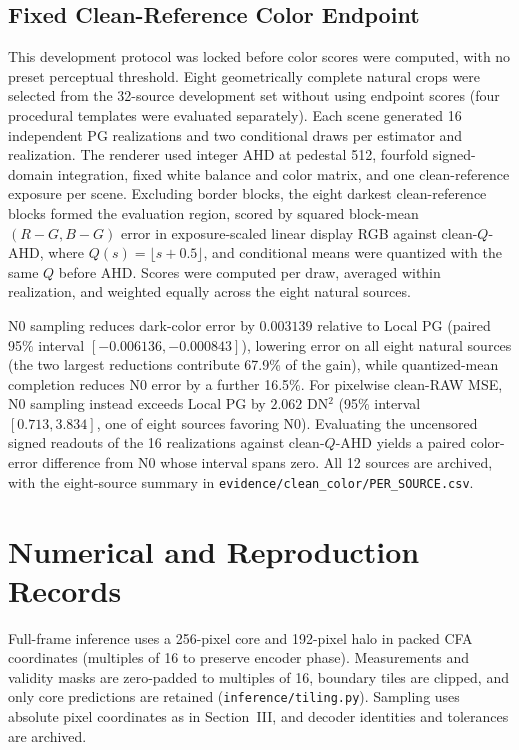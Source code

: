 \documentclass[10pt,twocolumn,journal]{IEEEtran}
\begin{document}
\subsection{Fixed Clean-Reference Color Endpoint}\label{sec:cleanendpoint}
This development protocol was locked before color scores were computed, with no preset perceptual threshold. Eight geometrically complete natural crops were selected from the 32-source development set without using endpoint scores (four procedural templates were evaluated separately). Each scene generated 16 independent PG realizations and two conditional draws per estimator and realization. The renderer used integer AHD at pedestal 512, fourfold signed-domain integration, fixed white balance and color matrix, and one clean-reference exposure per scene. Excluding border blocks, the eight darkest clean-reference blocks formed the evaluation region, scored by squared block-mean $(R-G,B-G)$ error in exposure-scaled linear display RGB against clean-$Q$-AHD, where $Q(s)=\lfloor s+0.5\rfloor$, and conditional means were quantized with the same $Q$ before AHD. Scores were computed per draw, averaged within realization, and weighted equally across the eight natural sources.

N0 sampling reduces dark-color error by $0.003139$ relative to Local PG (paired 95\% interval $[-0.006136,-0.000843]$), lowering error on all eight natural sources (the two largest reductions contribute 67.9\% of the gain), while quantized-mean completion reduces N0 error by a further 16.5\%. For pixelwise clean-RAW MSE, N0 sampling instead exceeds Local PG by $2.062$ DN$^2$ (95\% interval $[0.713,3.834]$, one of eight sources favoring N0). Evaluating the uncensored signed readouts of the 16 realizations against clean-$Q$-AHD yields a paired color-error difference from N0 whose interval spans zero. All 12 sources are archived, with the eight-source summary in \texttt{evidence/clean\_color/}\allowbreak\texttt{PER\_SOURCE.csv}.

\section{Numerical and Reproduction Records}
Full-frame inference uses a 256-pixel core and 192-pixel halo in packed CFA coordinates (multiples of 16 to preserve encoder phase). Measurements and validity masks are zero-padded to multiples of 16, boundary tiles are clipped, and only core predictions are retained (\texttt{inference/tiling.py}). Sampling uses absolute pixel coordinates as in Section~III, and decoder identities and tolerances are archived.
\end{document}
